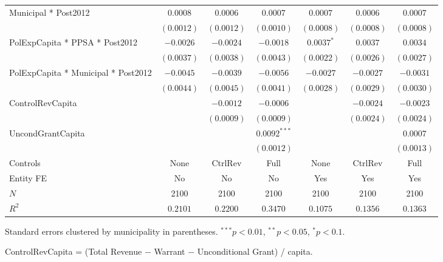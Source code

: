 \begin{table}[H]
\begin{minipage}{\textwidth}
\begin{tabular}{lcccccc}
        Municipal * Post2012 & $0.0008$ & $0.0006$ & $0.0007$ & $0.0007$ & $0.0006$ & $0.0007$ \\
         & $(0.0012)$ & $(0.0012)$ & $(0.0010)$ & $(0.0008)$ & $(0.0008)$ & $(0.0008)$ \\[4pt]
        PolExpCapita * PPSA * Post2012 & $-0.0026$ & $-0.0024$ & $-0.0018$ & $0.0037^{*}$ & $0.0037$ & $0.0034$ \\
         & $(0.0037)$ & $(0.0038)$ & $(0.0043)$ & $(0.0022)$ & $(0.0026)$ & $(0.0027)$ \\[4pt]
        PolExpCapita * Municipal * Post2012 & $-0.0045$ & $-0.0039$ & $-0.0056$ & $-0.0027$ & $-0.0027$ & $-0.0031$ \\
         & $(0.0044)$ & $(0.0045)$ & $(0.0041)$ & $(0.0028)$ & $(0.0029)$ & $(0.0030)$ \\[4pt]
        ControlRevCapita &  & $-0.0012$ & $-0.0006$ &  & $-0.0024$ & $-0.0023$ \\
         &  & $(0.0009)$ & $(0.0009)$ &  & $(0.0024)$ & $(0.0024)$ \\[4pt]
        UncondGrantCapita &  &  & $0.0092^{***}$ &  &  & $0.0007$ \\
         &  &  & $(0.0012)$ &  &  & $(0.0013)$ \\[4pt]
        \midrule
        Controls & None & CtrlRev & Full & None & CtrlRev & Full \\
        Entity FE & No & No & No & Yes & Yes & Yes \\
        $N$ & 2100 & 2100 & 2100 & 2100 & 2100 & 2100 \\
        $R^2$ & $0.2101$ & $0.2200$ & $0.3470$ & $0.1075$ & $0.1356$ & $0.1363$ \\
        \bottomrule
    \end{tabular}

    \vspace{6pt}
    {\scriptsize Standard errors clustered by municipality in parentheses. $^{***}p<0.01$, $^{**}p<0.05$, $^{*}p<0.1$.}

    {\scriptsize ControlRevCapita = (Total Revenue $-$ Warrant $-$ Unconditional Grant) / capita.}
    \end{minipage}
\end{table}